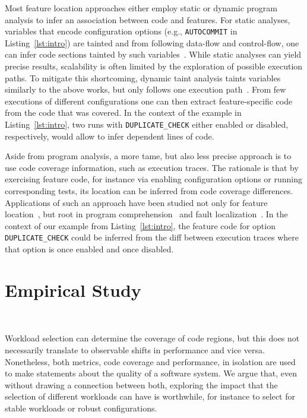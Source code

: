 Most feature location approaches either employ static or dynamic program analysis to infer an association between code and features. For static analyses, variables that encode configuration options (e.g., \texttt{AUTOCOMMIT} in Listing~\ref{lst:intro}) are tainted and from following data-flow and control-flow, one can infer code sections tainted by such variables~\cite{velez_2020_configcrusher_jase,lillack_2018_lotrack_tse,luo_2019_cova}.
While static analyses can yield precise results, scalability is often limited by the exploration of possible execution paths. To mitigate this shortcoming, dynamic taint analysis taints variables similarly to the above works, but only follows one execution path~\cite{bell_phosphor_2014,velez_comprex_2021,splat_kim_2013}. From few executions of different configurations one can then extract feature-specific code from the code that was covered. In the context of the example in Listing~\ref{lst:intro}, two runs with \texttt{DUPLICATE\_CHECK} either enabled or disabled, respectively, would allow to infer dependent lines of code.


Aside from program analysis, a more tame, but also less precise approach is to use code coverage information, such as execution traces.
The rationale is that by exercising feature code, for instance via enabling configuration options or running corresponding tests, its location can be inferred from code coverage differences. Applications of such an approach have been studied not only for feature location~\cite{wong_integrated_2005,sulir_annotation_2015,michelon_spectrum_2021,perez_framing_2016}, but root in program comprehension~\cite{wilde_early_1996,wilde_reconnaissance_1995,sherwood_reducing_nodate,perez_diagnosis_2014,castro_pangolin_2019} and fault localization~\cite{agrawal_fault_1995,wong_faultloc_2016}. In the context of our example from Listing~\ref{lst:intro}, the feature code for option \texttt{DUPLICATE\_CHECK} could be inferred from the diff between execution traces where that option is once enabled and once disabled.

\section{Empirical Study}~\label{sec:study}

Workload selection can determine the coverage of code regions, but this does not necessarily translate to observable shifts in performance and vice versa. Nonetheless, both metrics, code coverage and performance, in isolation are used to make statements about the quality of a software system. We argue that, even without drawing a connection between both, exploring the impact that the selection of different workloads can have is worthwhile, for instance to select for stable workloads or robust configurations.

